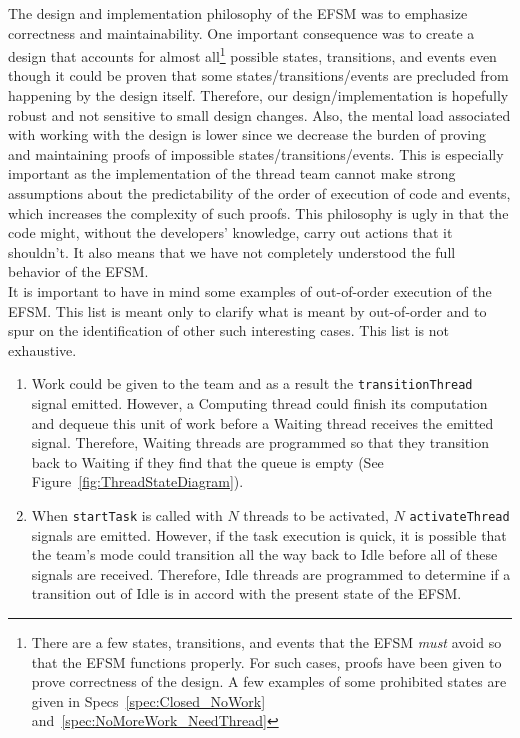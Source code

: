 \documentclass{article}
\begin{document}
The design and implementation philosophy of the EFSM was to emphasize
correctness and maintainability.  One important consequence was to create a
design that accounts for almost all\footnote{There are a few states,
transitions, and events that the EFSM \textit{must} avoid so that the EFSM
functions properly.  For such cases, proofs have been given to prove correctness
of the design.  A few examples of some prohibited states are given in
Specs~\ref{spec:Closed_NoWork} and~\ref{spec:NoMoreWork_NeedThread}} possible
states, transitions, and events even though it could be proven that some
states/transitions/events are precluded from happening by the design itself.
Therefore, our design/implementation is hopefully robust and not sensitive to
small design changes.  Also, the mental load associated with working with the
design is lower since we decrease the burden of proving and maintaining
proofs of impossible states/transitions/events.  This is especially important as
the implementation of the thread team cannot make strong assumptions about the
predictability of the order of execution of code and events, which increases the
complexity of such proofs.  This philosophy is ugly in that the code might,
without the developers' knowledge, carry out actions that it shouldn't.  It also
means that we have not completely understood the full behavior of the EFSM.\\

It is important to have in mind some examples of out-of-order execution of the
EFSM.  This list is meant only to clarify what is meant by out-of-order and to
spur on the identification of other such interesting cases.  This list is
not exhaustive.
\begin{enumerate}
\item{Work could be given to the team and as a result the
\texttt{transitionThread} signal emitted.  However, a Computing thread could
finish its computation and dequeue this unit of work before a Waiting thread
receives the emitted signal.  Therefore, Waiting threads are programmed so that
they transition back to Waiting if they find that the queue is empty (See
Figure~\ref{fig:ThreadStateDiagram}).}
\item{When \texttt{startTask} is called with $N$ threads to be activated, $N$
\texttt{activateThread} signals are emitted.  However, if the task execution is
quick, it is possible that the team's mode could transition all the way back to
Idle before all of these signals are received.  Therefore, Idle threads are
programmed to determine if a transition out of Idle is in accord with the
present state of the EFSM.}
\end{enumerate}
\end{document}
